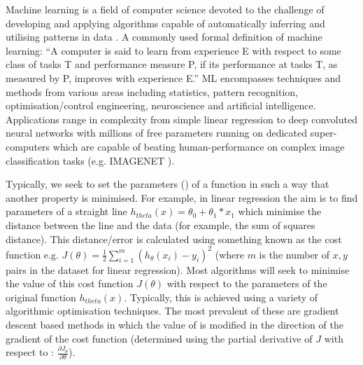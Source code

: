 Machine learning is a field of computer science 
devoted to the challenge of developing and applying algorithms capable of 
automatically inferring and utilising patterns in data \citep{Murphy2012}.
A commonly used formal definition of machine learning:
``A computer is said to learn from experience E with respect to some class of tasks 
T and performance measure P, if its performance at tasks T, as measured by P, improves 
with experience E.'' \citep{Mitchell1997} %
ML encompasses techniques and methods from various areas including statistics,
pattern recognition, optimisation/control engineering, neuroscience and artificial intelligence. %
Applications range in complexity from simple linear regression to deep convoluted neural networks %
with millions of free parameters running on dedicated super-computers \citep{Wu2014} 
which are capable of beating human-performance on complex image classification tasks 
(e.g. IMAGENET \citep{Berg2014,He2015}).

Typically, we seek to set the parameters (\theta) of a function in such a way
that another property is minimised.  For example, in linear regression the aim is to find 
parameters of a straight line \(h_{theta}(x) = \theta_{0} + \theta_{1} * x_{1}\) which minimise the distance %
between the line and the data (for example, the sum of squares distance).
This distance/error is calculated using something known as the cost function e.g. \(J(\theta) = \frac{1}{2} \sum^{m}_{i=1} (h_{\theta}(x_{i}) - y_{i})^2\) 
(where \(m\) is the number of \(x, y\) pairs in the dataset for linear regression).
Most algorithms will seek to minimise the value of this cost function \(J(\theta)\) with respect to 
the parameters of the original function \(h_{theta}(x)\).  Typically, this is achieved using a variety of algorithmic optimisation techniques. %
The most prevalent of these are gradient descent based methods in which the value of \theta is modified %
in the direction of the gradient of the cost function (determined using the partial derivative of \(J\) with respect to \theta: \(\frac{\partial J_{\theta}}{\partial\theta}\)). %


